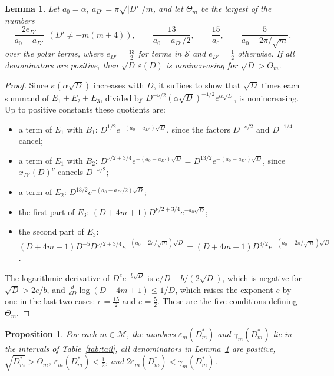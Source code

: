 \documentclass[11pt]{amsart}
\newtheorem{proposition}[theorem]{Proposition}
\newtheorem{lemma}[theorem]{Lemma}
\theoremstyle{definition}
\newcommand{\Mset}{\mathcal{M}}
\begin{document}
\begin{lemma}\label{lem:mono}
Let $a_0=\alpha$, $a_{D'}=\pi\sqrt{|D'|}/m$, and let $\Theta_m$ be the largest of the numbers
\[
\frac{2e_{D'}}{a_0-a_{D'}}\ \ (D'\ne-m(m+4)),\qquad \frac{13}{a_0-a_{D'}/2},\qquad\frac{15}{a_0},\qquad\frac{5}{a_0-2\pi/\sqrt m},
\]
over the polar terms, where $e_{D'}=\frac{13}2$ for terms in $\mathcal S$ and $e_{D'}=\frac12$ otherwise. If all denominators are positive, then $\sqrt D\,\varepsilon(D)$ is nonincreasing for $\sqrt D>\Theta_m$.
\end{lemma}

\begin{proof}
Since $\kappa(\alpha\sqrt D)$ increases with $D$, it suffices to show that $\sqrt D$ times each summand of $E_1+E_2+E_3$, divided by $D^{-\nu/2}(\alpha\sqrt D)^{-1/2}e^{\alpha\sqrt D}$, is nonincreasing. Up to positive constants these quotients are:
\begin{itemize}
\item a term of $E_1$ with $B_1$: $D^{1/2}e^{-(a_0-a_{D'})\sqrt D}$, since the factors $D^{-\nu/2}$ and $D^{-1/4}$ cancel;
\item a term of $E_1$ with $B_2$: $D^{\nu/2+3/4}e^{-(a_0-a_{D'})\sqrt D}=D^{13/2}e^{-(a_0-a_{D'})\sqrt D}$, since $x_{D'}(D)^\nu$ cancels $D^{-\nu/2}$;
\item a term of $E_2$: $D^{13/2}e^{-(a_0-a_{D'}/2)\sqrt D}$;
\item the first part of $E_3$: $(D+4m+1)D^{\nu/2+3/4}e^{-a_0\sqrt D}$;
\item the second part of $E_3$: $(D+4m+1)D^{-5}D^{\nu/2+3/4}e^{-(a_0-2\pi/\sqrt m)\sqrt D}=(D+4m+1)D^{3/2}e^{-(a_0-2\pi/\sqrt m)\sqrt D}$.
\end{itemize}
The logarithmic derivative of $D^ee^{-b\sqrt D}$ is $e/D-b/(2\sqrt D)$, which is negative for $\sqrt D>2e/b$, and $\frac{d}{dD}\log(D+4m+1)\le1/D$, which raises the exponent $e$ by one in the last two cases: $e=\frac{15}2$ and $e=\frac52$. These are the five conditions defining $\Theta_m$.
\end{proof}

\begin{proposition}\label{prop:certificate}
For each $m\in\Mset$, the numbers $\varepsilon_m(D^*_m)$ and $\gamma_m(D^*_m)$ lie in the intervals of Table~\ref{tab:tail}, all denominators in Lemma~\ref{lem:mono} are positive, $\sqrt{D^*_m}>\Theta_m$, $\varepsilon_m(D^*_m)<\frac12$, and $2\varepsilon_m(D^*_m)<\gamma_m(D^*_m)$.
\end{proposition}
\end{document}
